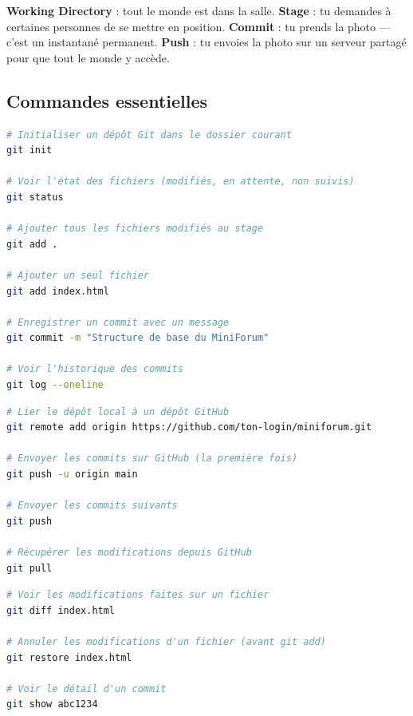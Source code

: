 \documentclass[a4paper,11pt]{article}
\begin{document}
\begin{tcolorbox}[astuce, title={Analogie --- La photo de groupe}]
\textbf{Working Directory} : tout le monde est dans la salle.
\textbf{Stage} : tu demandes à certaines personnes de se mettre en position.
\textbf{Commit} : tu prends la photo --- c'est un instantané permanent.
\textbf{Push} : tu envoies la photo sur un serveur partagé pour que tout le monde y accède.
\end{tcolorbox}

\subsection{Commandes essentielles}

\begin{lstlisting}[language=bash, caption={Initialiser un projet Git}]
# Initialiser un dépôt Git dans le dossier courant
git init

# Voir l'état des fichiers (modifiés, en attente, non suivis)
git status

# Ajouter tous les fichiers modifiés au stage
git add .

# Ajouter un seul fichier
git add index.html

# Enregistrer un commit avec un message
git commit -m "Structure de base du MiniForum"

# Voir l'historique des commits
git log --oneline
\end{lstlisting}

\begin{lstlisting}[language=bash, caption={Synchroniser avec GitHub}]
# Lier le dépôt local à un dépôt GitHub
git remote add origin https://github.com/ton-login/miniforum.git

# Envoyer les commits sur GitHub (la première fois)
git push -u origin main

# Envoyer les commits suivants
git push

# Récupérer les modifications depuis GitHub
git pull
\end{lstlisting}

\begin{lstlisting}[language=bash, caption={Revenir en arrière}]
# Voir les modifications faites sur un fichier
git diff index.html

# Annuler les modifications d'un fichier (avant git add)
git restore index.html

# Voir le détail d'un commit
git show abc1234
\end{lstlisting}
\end{document}
